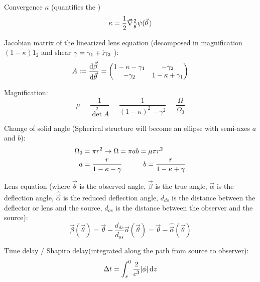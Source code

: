 			\noindent
			Convergence $\kappa$ (quantifies the )
			\begin{equation}
				\kappa = \frac{1}{2} \Nabla_{\vec{\theta}}^2 \psi(\vec{\theta})
			\end{equation}

			\noindent
			Jacobian matrix of the linearized lens equation (decomposed in magnification $(1-\kappa) 1_{2}$ and shear $\gamma =\gamma_1 + \mathrm{i} \gamma_2$ ):
			\begin{equation}
				A := \dv{\vec{\beta}}{\vec{\theta}} = \mqty(
				1 - \kappa - \gamma_1 & -\gamma_2 \\
				-\gamma_2 & 1 - \kappa + \gamma_1)
			\end{equation}

			\noindent
			Magnification:
			\begin{equation}
				\mu  =\frac{1}{\det^2 A} = \frac{1}{(1-\kappa)^2 - \gamma^2} = \frac{\Omega}{\Omega_0}
			\end{equation}

			\noindent
			Change of solid angle (Spherical structure will become an ellipse with semi-axes $a$ and $b$):
			\begin{equation}
				\begin{aligned}
					\Omega_0 &= \pi r^2 \to \Omega = \pi a b = \mu \pi r^2 \\
					a &= \frac{r}{1-\kappa-\gamma} \hspace{30pt} b = \frac{r}{1-\kappa+\gamma}
				\end{aligned}
			\end{equation}

			\noindent
			Lens equation (where $\vec{\theta}$ is the observed angle, $\vec{\beta}$ is the true angle, $\vec{\alpha}$ is the deflection angle, $\hat{\vec{\alpha}}$ is the reduced deflection angle, $d_{ds}$ is the distance between the deflector or lens and the source, $d_{os}$ is the distance between the observer and the source):
			\begin{equation}
				\vec{\beta}(\vec{\theta})
				= \vec{\theta} - \frac{d_{ds}}{d_{os}} \vec{\alpha}(\vec{\theta})
				= \vec{\theta} - \hat{\vec{\alpha}}(\vec{\theta})
			\end{equation}

			\noindent
			Time delay / Shapiro delay(integrated along the path from source to observer):
			\begin{equation}
				\Delta t = \int_{s}^{0} \frac{2}{c^3} \abs{\phi} \dd{z}
			\end{equation}